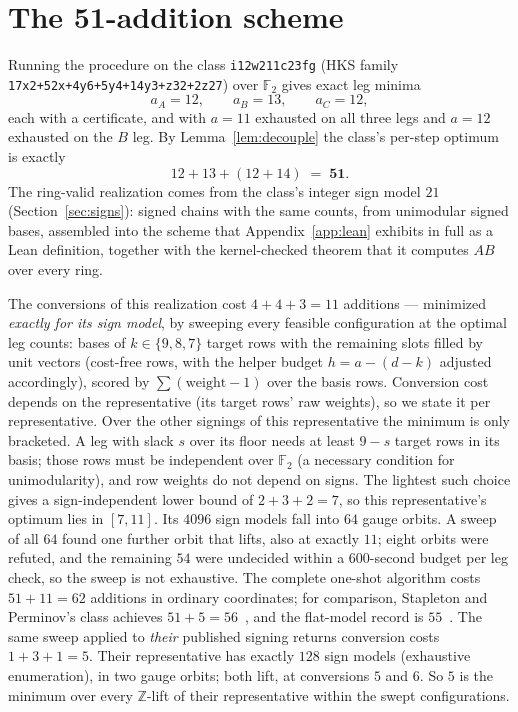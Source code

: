 \documentclass[11pt]{article}
\theoremstyle{definition}
\theoremstyle{remark}
\newcommand{\F}{\mathbb{F}}
\newcommand{\Z}{\mathbb{Z}}
\begin{document}
\section{The 51-addition scheme}\label{sec:result}

Running the procedure on the class \texttt{i12w211c23fg} (HKS family
\texttt{17x2+\allowbreak 52x+\allowbreak 4y6+\allowbreak 5y4+\allowbreak 14y3+\allowbreak z32+\allowbreak 2z27}) over $\F_2$ gives exact leg
minima
\[
a_A = 12,\qquad a_B = 13,\qquad a_C = 12,
\]
each with a certificate, and with $a{=}11$ exhausted on all three legs
and $a{=}12$ exhausted on the $B$ leg.  By
Lemma~\ref{lem:decouple} the class's per-step optimum is exactly
\[
12+13+(12+14) \;=\; \mathbf{51}.
\]
The ring-valid realization comes from the class's integer sign model
$21$ (Section~\ref{sec:signs}): signed chains with the same counts,
from unimodular signed bases, assembled into the scheme that
Appendix~\ref{app:lean} exhibits in full as a Lean definition,
together with the kernel-checked theorem that it computes $AB$ over
every ring.

The conversions of this realization cost $4+4+3=11$ additions ---
minimized \emph{exactly for its sign model}, by sweeping every
feasible configuration at the optimal leg counts: bases of
$k\in\{9,8,7\}$ target rows with the remaining slots filled by unit
vectors (cost-free rows, with the helper budget $h=a-(d-k)$ adjusted
accordingly), scored by $\sum(\mathrm{weight}-1)$ over the basis rows.
Conversion cost depends on the representative (its target rows' raw
weights), so we state it per representative.  Over the other signings
of this representative the minimum is only bracketed.  A leg with
slack $s$ over its floor needs at least $9-s$ target rows in its
basis; those rows must be independent over $\F_2$ (a necessary
condition for unimodularity), and row weights do not depend on signs.
The lightest such choice gives a sign-independent lower bound of
$2+3+2=7$, so this representative's optimum lies in $[7,11]$.  Its
$4096$ sign models fall into $64$ gauge orbits.  A sweep of all $64$
found one further orbit that lifts, also at exactly $11$; eight
orbits were refuted, and the remaining $54$ were undecided within a
$600$-second budget per leg check, so the sweep is not exhaustive.
The complete one-shot
algorithm costs $51+11=62$ additions in ordinary coordinates; for
comparison, Stapleton and Perminov's class achieves
$51+5=56$~\cite{SP26}, and the flat-model record is
$55$~\cite{Sidebottom26,KI26}.  The same sweep applied to \emph{their}
published signing returns conversion costs $1+3+1=5$.  Their
representative has exactly $128$ sign models (exhaustive enumeration),
in two gauge orbits; both lift, at conversions $5$ and $6$.  So $5$ is
the minimum over every $\Z$-lift of their representative within the
swept configurations.
\end{document}
